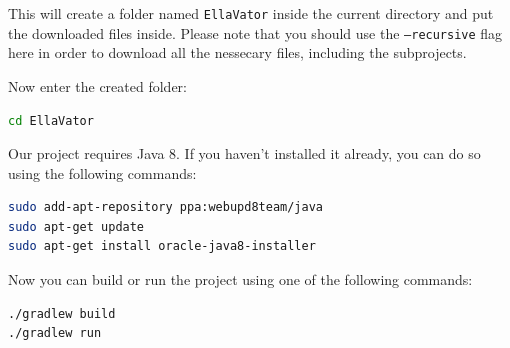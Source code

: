 \documentclass[a4paper, 12pt]{article}
\begin{document}
This will create a folder named \texttt{EllaVator} inside the current directory and put the downloaded files inside.
Please note that you should use the \texttt{--recursive} flag here in order to download all the nessecary files, including the subprojects.

Now enter the created folder:
\begin{lstlisting}[language=bash]
cd EllaVator
\end{lstlisting}

Our project requires Java 8. If you haven't installed it already, you can do so using the following commands:
\begin{lstlisting}[language=bash]
sudo add-apt-repository ppa:webupd8team/java
sudo apt-get update
sudo apt-get install oracle-java8-installer
\end{lstlisting}

Now you can build or run the project using one of the following commands:
\begin{lstlisting}[language=bash]
./gradlew build
./gradlew run
\end{lstlisting}

\cleardoublepage


\end{document}

